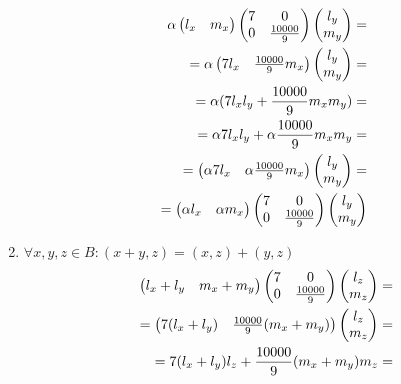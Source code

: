 \begin{enumerate}
{\begin{align*}
          \alpha\begin{pmatrix}l_x & m_x\end{pmatrix}
          {\begin{pmatrix} {7}& 0 \\ 0 & {\frac{10000}{9}}\end{pmatrix}}
          \begin{pmatrix}l_y\\m_y\end{pmatrix}=     \\
          =\alpha\begin{pmatrix}{7} l_x & {\frac{10000}{9}} m_x\end{pmatrix}
          \begin{pmatrix}l_y\\m_y\end{pmatrix}=     \\
          =\alpha({7} l_xl_y + {\frac{10000}{9}} m_xm_y)=     \\
          =\alpha{7} l_xl_y + \alpha{\frac{10000}{9}} m_xm_y= \\
          =\begin{pmatrix}\alpha{7} l_x & \alpha {\frac{10000}{9}} m_x\end{pmatrix}
          \begin{pmatrix}l_y\\m_y\end{pmatrix}=     \\
          =\begin{pmatrix}\alpha l_x & \alpha m_x\end{pmatrix}
          {\begin{pmatrix} {7}& 0 \\ 0 & {\frac{10000}{9}}\end{pmatrix}}
          \begin{pmatrix}l_y\\m_y\end{pmatrix}
        \end{align*}
        }
  \item {
        $\forall x,y,z \in B : (x+y,z)=(x,z)+(y,z)$
        \begin{align*}
          \ \begin{pmatrix}l_x + l_y & m_x + m_y\end{pmatrix}
          \mtx
          \begin{pmatrix}l_z \\ m_z\end{pmatrix}=     \\
          =\begin{pmatrix}\mtxa(l_x + l_y) & \mtxb(m_x + m_y)\end{pmatrix}
          \begin{pmatrix}l_z \\ m_z\end{pmatrix}=     \\
          =\mtxa(l_x + l_y)l_z + \mtxb(m_x + m_y)m_z= \\

\end{align*}}
\end{enumerate}

